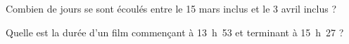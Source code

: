 \begin{myenumerate}
\item Combien de jours se sont écoulés entre le 15 mars inclus et le 3
avril inclus ?
\item Quelle est la durée d'un film commençant à 13~h~53 et terminant à
15~h~27 ?
\end{myenumerate}